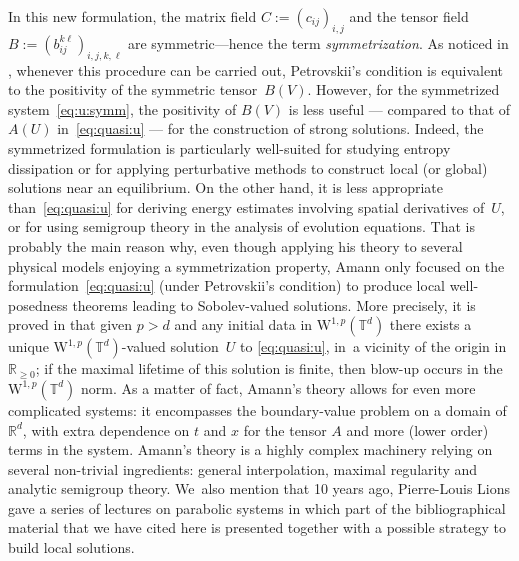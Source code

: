 \documentclass[JEP,XML,SOM,Unicode,published]{cedram}
\theoremstyle{definition}
\newcommand\R{\mathbb{R}}
\newcommand\T{\mathbb{T}}
\newcommand\W{\mathrm{W}}
\begin{document}
{In this new formulation, the matrix field $C:= (c_{ij})_{i,j}$ and the tensor field $B:=(b_{ij}^{k\ell})_{i,j,k,\ell}$ are symmetric---hence the term \emph{symmetrization}. As noticed in \cite{gio}, whenever this procedure can be carried out, Petrovskii's condition is equivalent to the positivity of the symmetric tensor~$B(V)$. However, for the symmetrized system~\eqref{eq:u:symm}, the positivity of $B(V)$ is less useful --- compared to that of $A(U)$ in~\eqref{eq:quasi:u} --- for the construction of strong solutions. Indeed, the symmetrized formulation is particularly well-suited for studying entropy dissipation or for applying perturbative methods to construct local (or global) solutions near an equilibrium. On the other hand, it is less appropriate than~\eqref{eq:quasi:u} for deriving energy estimates involving spatial derivatives of~$U$, or for using semigroup theory in the analysis of evolution equations. That is probably the main reason why, even though applying his theory to several physical models enjoying a symmetrization property, Amann only focused on the formulation~\eqref{eq:quasi:u} (under Petrovskii's condition) to produce local well-posedness theorems leading to Sobolev-valued solutions.} More precisely, it is proved in \cite{amann} that given $p>d$ and any initial data in $\W^{1,p}(\T^d)$ there exists a unique $\W^{1,p}(\T^d)$-valued solution~$U$ to \eqref{eq:quasi:u}, in~a vicinity of the origin in $\R_{\geq 0}$; if the maximal lifetime of this solution is finite, then blow-up occurs in the $\W^{1,p}(\T^d)$ norm. As a matter of fact, Amann's theory allows for even more complicated systems: it encompasses the boundary-value problem on a domain of $\R^d$, with extra dependence on $t$ and $x$ for the tensor $A$ and more (lower order) terms in the system. Amann's theory is a highly complex machinery relying on several non-trivial ingredients: general interpolation, maximal regularity and analytic semigroup theory. We~also mention that 10 years ago, Pierre-Louis Lions gave a series of lectures on parabolic systems \cite{pilou} in which part of the bibliographical material that we have cited here is presented together with a possible strategy to build local solutions.
\end{document}
